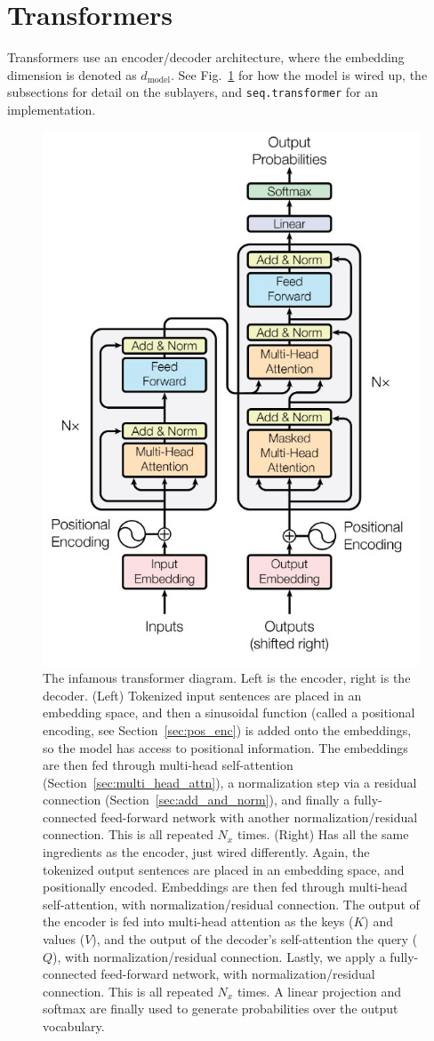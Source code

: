 \documentclass[11pt]{article}
\numberwithin{equation}{section}
\begin{document}
\newcommand{\dmodel}{d_{\text{model}}}

\section{Transformers}


Transformers \citep{Vaswani17} use an encoder/decoder architecture, where the embedding dimension is denoted as $\dmodel$. See Fig.~\ref{fig:tfm} for how the model is wired up, the subsections for detail on the sublayers, and \verb+seq.transformer+ for an implementation.

\begin{figure}
\begin{center}
\includegraphics[width=0.4\columnwidth]{../figures/transformer.jpg}  
\end{center}
\caption{The infamous transformer diagram. Left is the encoder, right is the decoder. (Left) Tokenized input sentences are placed in an embedding space, and then a sinusoidal function (called a positional encoding, see Section~\ref{sec:pos_enc}) is added onto the embeddings, so the model has access to positional information. The embeddings are then fed through multi-head self-attention (Section~\ref{sec:multi_head_attn}), a normalization step via a residual connection (Section~\ref{sec:add_and_norm}), and finally a fully-connected feed-forward network with another normalization/residual connection. This is all repeated $N_x$ times. (Right) Has all the same ingredients as the encoder, just wired differently. Again, the tokenized output sentences are placed in an embedding space, and positionally encoded. Embeddings are then fed through multi-head self-attention, with normalization/residual connection. The output of the encoder is fed into multi-head attention as the keys ($K$) and values ($V$), and the output of the decoder's self-attention the query ($Q$), with normalization/residual connection. Lastly, we apply a fully-connected feed-forward network, with normalization/residual connection. This is all repeated $N_x$ times. A linear projection and softmax are finally used to generate probabilities over the output vocabulary.}
\label{fig:tfm}
\end{figure}
\end{document}
